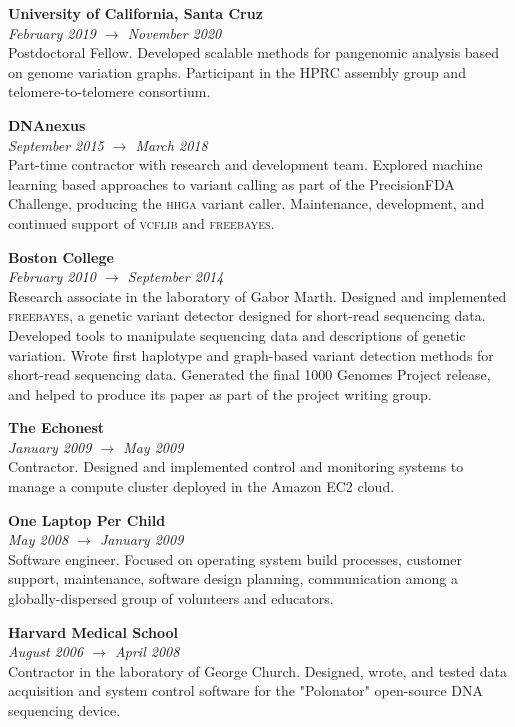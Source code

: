 \documentclass[11pt,hidelinks,letterpaper]{article}
\begin{document}
\hfill \break
\noindent
{\large \bf University of California, Santa Cruz} \\
\emph{February 2019 $\to$ November 2020} \\
\noindent
Postdoctoral Fellow. %
Developed scalable methods for pangenomic analysis based on genome variation graphs.
Participant in the HPRC assembly group and telomere-to-telomere consortium.

\hfill \break
\noindent
{\large \bf DNAnexus} \\
\emph{September 2015 $\to$ March 2018} \\
\noindent
Part-time contractor with research and development team. Explored machine learning based approaches to variant calling as part of the PrecisionFDA Challenge, producing the \textsc{hhga} variant caller.
Maintenance, development, and continued support of \textsc{vcflib} and \textsc{freebayes}.

\hfill \break
\noindent
{\large \bf Boston College} \\
\emph{February 2010 $\to$ September 2014} \\
Research associate in the laboratory of Gabor Marth.
Designed and implemented \textsc{freebayes}, a genetic variant detector designed for short-read sequencing data.
Developed tools to manipulate sequencing data and descriptions of genetic variation.
Wrote first haplotype and graph-based variant detection methods for short-read sequencing data.
Generated the final 1000 Genomes Project release, and helped to produce its paper as part of the project writing group.


\hfill \break
\noindent
{\large \bf The Echonest} \\
\emph{January 2009 $\to$ May 2009} \\
Contractor. Designed and implemented control and monitoring systems to manage a compute cluster deployed in the Amazon EC2 cloud.

\hfill \break
\noindent
{\large \bf One Laptop Per Child} \\
\emph{May 2008 $\to$ January 2009} \\
Software engineer. Focused on operating system build processes, customer support, maintenance, software design planning, communication among a globally-dispersed group of volunteers and educators.

\hfill \break
\noindent
{\large \bf Harvard Medical School} \\
\emph{August 2006 $\to$ April 2008} \\
Contractor in the laboratory of George Church. Designed, wrote, and tested data acquisition and system control software for the "Polonator" open-source DNA sequencing device.
\end{document}
